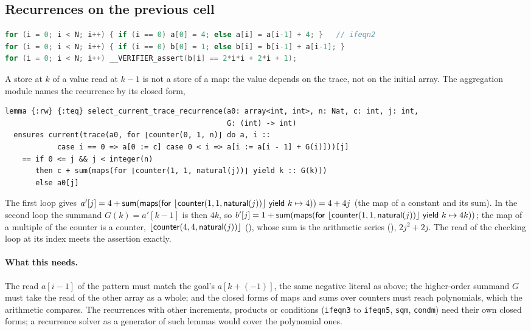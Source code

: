 \subsection{Recurrences on the previous cell}\label{sec:ifeqn2}
\begin{lstlisting}[language=C]
for (i = 0; i < N; i++) { if (i == 0) a[0] = 4; else a[i] = a[i-1] + 4; }   // ifeqn2
for (i = 0; i < N; i++) { if (i == 0) b[0] = 1; else b[i] = b[i-1] + a[i-1]; }
for (i = 0; i < N; i++) __VERIFIER_assert(b[i] == 2*i*i + 2*i + 1);
\end{lstlisting}
A store at $k$ of a value read at $k - 1$ is not a store of a map: the value depends on the trace, not on the initial
array. The aggregation module names the recurrence by its closed form,
\begin{lstlisting}
lemma {:rw} {:teq} select_current_trace_recurrence(a0: array<int, int>, n: Nat, c: int, j: int,
                                                   G: (int) -> int)
  ensures current(trace(a0, for ⌊counter(0, 1, n)⌋ do a, i ::
            case i == 0 => a[0 := c] case 0 < i => a[i := a[i - 1] + G(i)]))[j]
    == if 0 <= j && j < integer(n)
       then c + sum(maps(for ⌊counter(1, 1, natural(j))⌋ yield k :: G(k)))
       else a0[j]
\end{lstlisting}
The first loop gives $a'[j] = 4 + \mathsf{sum}(\mathsf{maps}(\mathsf{for}\ \lfloor \mathsf{counter}(1, 1, \mathsf{natural}(j))\rfloor\ \mathsf{yield}\ k \mapsto 4)) = 4 + 4j$ (the map of a
constant and its sum). In the second loop the summand $G(k) = a'[k - 1]$ is then $4k$, so
$b'[j] = 1 + \mathsf{sum}(\mathsf{maps}(\mathsf{for}\ \lfloor \mathsf{counter}(1, 1, \mathsf{natural}(j))\rfloor\ \mathsf{yield}\ k \mapsto 4k))$; the map of a multiple of the counter is
a counter, $\lfloor \mathsf{counter}(4, 4, \mathsf{natural}(j))\rfloor$ (), whose sum is the arithmetic series
(), $2j^2 + 2j$. The read of the checking loop at its index meets the assertion exactly.

\paragraph{What this needs.} The read $a[i - 1]$ of the pattern must match the goal's $a[k + (-1)]$, the same negative
literal as above; the higher-order summand $G$ must take the read of the other array as a whole; and the closed forms
of maps and sums over counters must reach polynomials, which the arithmetic compares. The recurrences with other
increments, products or conditions (\texttt{ifeqn3} to \texttt{ifeqn5}, \texttt{sqm}, \texttt{condm}) need their own
closed forms; a recurrence solver as a generator of such lemmas would cover the polynomial ones.
